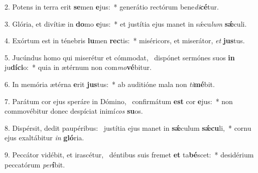2. Potens in terra erit \textbf{se}men \textbf{e}jus:~*  generátio rectórum bene\textit{di}\textbf{cé}tur.\

3. Glória, et divítiæ in \textbf{do}mo \textbf{e}jus:~*  et justítia ejus manet in sǽcu\textit{lum} \textbf{sǽ}culi.\

4. Exórtum est in ténebris \textbf{lu}men \textbf{rec}tis:~*  miséricors, et miserátor, \textit{et} \textbf{jus}tus.\

5. Jucúndus homo qui miserétur et cómmodat, \dag\  dispónet sermónes suos \textbf{in} ju\textbf{dí}\textbf{ci}o:~*  quia in ætérnum non com\textit{mo}\textbf{vé}bitur.\

6. In memória ætérna \textbf{e}rit \textbf{jus}tus:~*  ab auditióne mala non \textit{ti}\textbf{mé}bit.\

7. Parátum cor ejus speráre in Dómino, \dag\  confirmátum \textbf{est} cor \textbf{e}jus:~*  non commovébitur donec despíciat inimí\textit{cos} \textbf{su}os.\

8. Dispérsit, dedit paupéribus: \dag\  justítia ejus manet in \textbf{sǽ}culum \textbf{sǽ}\textbf{cu}li,~*  cornu ejus exaltábitur \textit{in} \textbf{gló}ria.\

9. Peccátor vidébit, et irascétur, \dag\  déntibus suis fremet \textbf{et} ta\textbf{bé}scet:~*  desidérium peccatórum \textit{per}\textbf{í}bit.\

